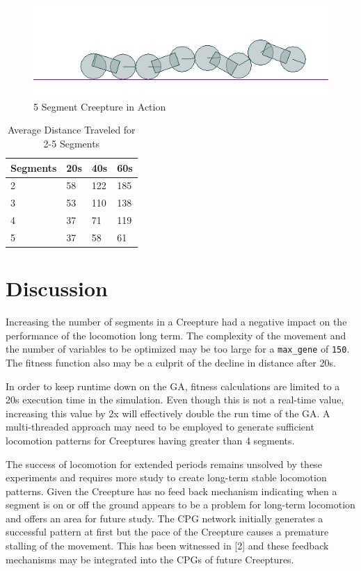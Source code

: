 \documentclass{acm_proc_article-sp}
\begin{document}
\begin{figure}
\centering
\includegraphics[width=.5\textwidth]{images/chain.png}
\caption{5 Segment Creepture in Action \label{chain}}
\end{figure}

\begin{table}
\centering
\caption{Average Distance Traveled for 2-5 Segments}
\begin{tabular}{|l|l|l|l|} \hline
Segments & 20s & 40s & 60s\\ \hline
2 & 58 & 122 & 185\\ \hline
3 & 53 & 110 & 138\\ \hline
4 & 37 & 71 & 119\\ \hline
5 & 37 & 58 & 61\\ \hline
\end{tabular}
\end{table}

\section{Discussion}

Increasing the number of segments in a Creepture had a negative impact on
the performance of the locomotion long term. The complexity of the
movement and the number of variables to be optimized may be too large
for a \texttt{max\_gene} of \texttt{150}. The fitness function also may
be a culprit of the decline in distance after 20s.

In order to keep runtime down on the GA, fitness calculations are
limited to a 20s execution time in the simulation. Even though this is
not a real-time value, increasing this value by 2x will effectively
double the run time of the GA.  A multi-threaded approach may need to be employed to generate sufficient locomotion patterns for Creeptures having greater than 4 segments.

The success of locomotion for extended periods remains unsolved by these experiments and requires more study to create long-term stable locomotion patterns.  Given the Creepture has no feed back mechanism indicating when a segment is on or off the ground appears to be a problem for long-term locomotion and offers an area for future study.  The CPG network initially generates a successful pattern at first but the pace of the Creepture causes a premature stalling of the movement.  This has been witnessed in [2] and these feedback mechanisms may be integrated into the CPGs of future Creeptures.
\end{document}
